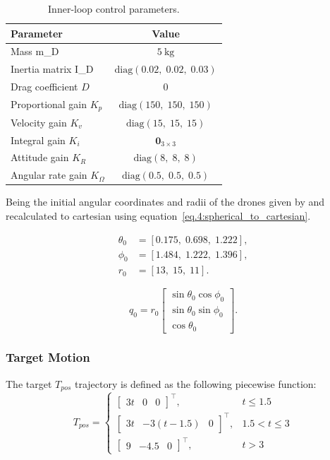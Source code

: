 \begin{table}[h]
\centering
\caption{Inner-loop control parameters.}
\begin{tabular}{l c}
\hline
Parameter & Value \\
\hline
Mass \gls{m_D} & $5~\text{kg}$ \\
Inertia matrix \gls{I_D} &
$\mathrm{diag}(0.02,\;0.02,\;0.03)$ \\
Drag coefficient $D$ & $0$ \\
Proportional gain $K_p$ & $\mathrm{diag}(150,\;150,\;150)$ \\
Velocity gain $K_v$ & $\mathrm{diag}(15,\;15,\;15)$ \\
Integral gain $K_i$ & $\mathbf{0}_{3\times3}$ \\
Attitude gain $K_R$ & $\mathrm{diag}(8,\;8,\;8)$ \\
Angular rate gain $K_\Omega$ & $\mathrm{diag}(0.5,\;0.5,\;0.5)$ \\
\hline
\end{tabular}
\end{table}

Being the initial angular coordinates and radii of the drones given by and recalculated to cartesian using equation~\eqref{eq.4:spherical_to_cartesian}.

\begin{align*}
    \theta_0 &= [0.175,\;0.698,\;1.222], \\
    \phi_0 &= [1.484,\;1.222,\;1.396], \\
    r_0 &= [13,\;15,\;11].
\end{align*}

\begin{equation}
    q_0 = r_0
    \begin{bmatrix}
        \sin\theta_0 \cos\phi_0 \\
        \sin\theta_0 \sin\phi_0 \\
        \cos\theta_0
    \end{bmatrix}.
    \label{eq.4:spherical_to_cartesian}
\end{equation}

\subsubsection{Target Motion}

The target $T_{pos}$ trajectory is defined as the following piecewise function:
\begin{equation*}
  T_{pos} =
  \begin{cases}
  \begin{bmatrix}
  3t &
  0 &
  0
  \end{bmatrix}^\top,
  & t \le 1.5 \\[8pt]

  \begin{bmatrix}
  3t &
  -3(t - 1.5) &
  0
  \end{bmatrix}^\top,
  & 1.5 < t \le 3 \\[8pt]

  \begin{bmatrix}
  9 &
  -4.5 &
  0
  \end{bmatrix}^\top,
  & t > 3
  \end{cases}
\end{equation*}

